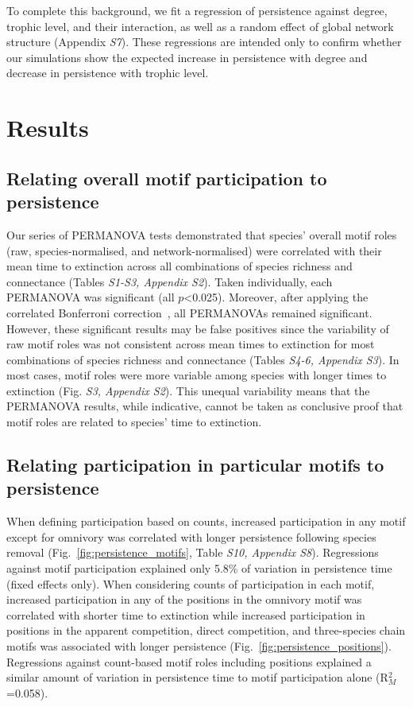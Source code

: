 \documentclass[12pt]{article}
\begin{document}
\begin{spacing}{2.0}
            
            To complete this background, we fit a regression of persistence against degree, trophic level, and their interaction, as well as a random effect of global network structure (Appendix \emph{S7}). 
            These regressions are intended only to confirm whether our simulations show the expected increase in persistence with degree and decrease in persistence with trophic level. 


\section*{Results}
	
    \subsection*{Relating overall motif participation to persistence}
    
		Our series of PERMANOVA tests demonstrated that species' overall motif roles (raw, species-normalised, and network-normalised) were correlated with their mean time to extinction across all combinations of species richness and connectance (Tables \emph{S1-S3, Appendix S2}). 
        Taken individually, each PERMANOVA was significant (all $p$\textless0.025). Moreover, after applying the correlated Bonferroni correction~\citep{Drezner2016}, all PERMANOVAs remained significant.
		However, these significant results may be false positives since the variability of raw motif roles was not consistent across mean times to extinction for most combinations of species richness and connectance (Tables \emph{S4-6, Appendix S3}). 
        In most cases, motif roles were more variable among species with longer times to extinction (Fig. \emph{S3, Appendix S2}).
        This unequal variability means that the PERMANOVA results, while indicative, cannot be taken as conclusive proof that motif roles are related to species' time to extinction.
    

    \subsection*{Relating participation in particular motifs to persistence}
    
        When defining participation based on counts, increased participation in any motif except for omnivory was correlated with longer persistence following species removal (Fig.~\ref{fig:persistence_motifs}, Table \emph{S10, Appendix S8}).
        Regressions against motif participation explained only 5.8\% of variation in persistence time (fixed effects only).
        When considering counts of participation in each motif, increased participation in any of the positions in the omnivory motif was correlated with shorter time to extinction while increased participation in positions in the apparent competition, direct competition, and three-species chain motifs was associated with longer persistence (Fig.~\ref{fig:persistence_positions}).
        Regressions against count-based motif roles including positions explained a similar amount of variation in persistence time to motif participation alone (R$^2_M$=0.058).
        

\end{spacing}
\end{document}
